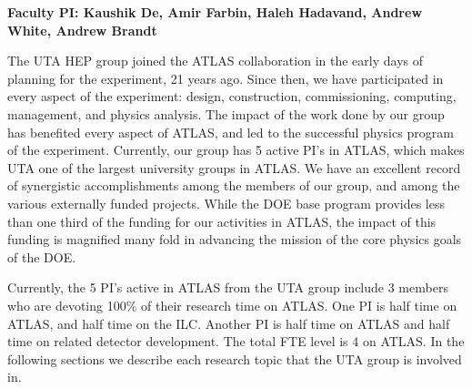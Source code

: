 
\textbf{Faculty PI: Kaushik De, Amir Farbin, Haleh Hadavand, Andrew White, Andrew Brandt}

The UTA HEP group joined the ATLAS collaboration in the early days of planning for the experiment, 21 years ago. Since then, we have participated in every aspect of the experiment: design, construction, commissioning, computing, management, and physics analysis. 
The impact of the work done by our group has benefited every aspect of ATLAS, and led to the successful physics program of the experiment. 
Currently, our group has 5 active PI's in ATLAS, which makes UTA one of the largest university groups in ATLAS. We have an excellent record of synergistic accomplishments 
among the members of our group, and among the various externally funded projects. While the DOE base program provides less than one third of the funding for our activities in ATLAS, the impact of 
this funding is magnified many fold in advancing the mission of the core physics goals of the DOE.

Currently, the 5 PI's active in ATLAS from the UTA group include 3 members who are devoting 100\% of their research time on ATLAS. One PI is half time on ATLAS, and half time on the ILC. Another PI is half time on ATLAS and half time on related detector development. The total FTE level is 4 on ATLAS. In the following sections we describe each research topic that the UTA group is involved in.